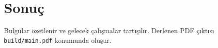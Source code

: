 \chapter{Sonuç}
\label{chap:sonuc}

Bulgular özetlenir ve gelecek çalışmalar tartışılır. Derlenen \ac{PDF} çıktısı
\texttt{build/main.pdf} konumunda oluşur.
